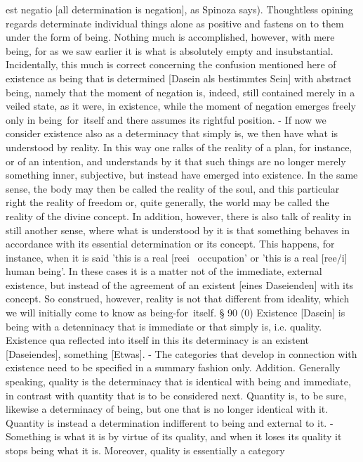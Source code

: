 est negatio [all determination is negation], as Spinoza says). Thoughtless opining
regards determinate individual things alone as positive and fastens on to them
under the form of being. Nothing much is accomplished, however, with mere
being, for as we saw earlier it is what is absolutely empty and insubstantial.
Incidentally, this much is correct concerning the confusion mentioned here of
existence as being that is determined [Dasein als bestimmtes Sein] with abstract
being, namely that the moment of negation is, indeed, still contained merely in
a veiled state, as it were, in existence, while the moment of negation emerges
freely only in being~for~itself and there assumes its rightful position. - If now
we consider existence also as a determinacy that simply is, we then have what is
understood by reality. In this way one ralks of the reality of a plan, for instance,
or of an intention, and understands by it that such things are no longer merely
something inner, subjective, but instead have emerged into existence. In the same
sense, the body may then be called the reality of the soul, and this particular right
the reality of freedom or, quite generally, the world may be called the reality of the
divine concept. In addition, however, there is also talk of reality in still another
sense, where what is understood by it is that something behaves in accordance
with its essential determination or its concept. This happens, for instance, when
it is said 'this is a real [reei~ occupation' or 'this is a real [ree/i] human being'. In
these cases it is a matter not of the immediate, external existence, but instead of
the agreement of an existent [eines Daseienden] with its concept. So construed,
however, reality is not that different from ideality, which we will initially come to
know as being-for~itself.
§ 90
(0) Existence [Dasein] is being with a detenninacy that is immediate or
that simply is, i.e. quality. Existence qua reflected into itself in this its
determinacy is an existent [Daseiendes], something [Etwas]. - The categories
that develop in connection with existence need to be specified in a summary
fashion only.
Addition. Generally speaking, quality is the determinacy that is identical with
being and immediate, in contrast with quantity that is to be considered next.
Quantity is, to be sure, likewise a determinacy of being, but one that is no longer
identical with it. Quantity is instead a determination indifferent to being and
external to it. - Something is what it is by virtue of its quality, and when it loses
its quality it stops being what it is. Moreover, quality is essentially a category
